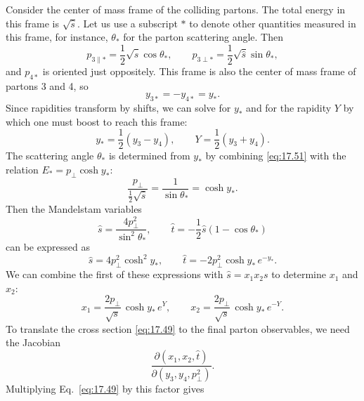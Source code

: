Consider the center of mass frame of the colliding partons.  The total energy
in this frame is $\sqrt{\hat{s}}$.  Let us use a subscript $*$ to denote
other quantities measured in this frame, for instance, $\theta_*$ for the
parton scattering angle.  Then
\begin{equation}
  p_{3\parallel*} = \frac{1}{2}\sqrt{\hat{s}}\cos\theta_*,\qquad
  p_{3\perp*} = \frac{1}{2}\sqrt{\hat{s}}\sin\theta_* ,
  \label{eq:17.51}
\end{equation}
and $p_{4*}$ is oriented just oppositely.  This frame is also the center of
mass frame of partons 3 and 4, so
\begin{equation}
  y_{3*} = -y_{4*} = y_* .
  \label{eq:17.52}
\end{equation}
Since rapidities transform by shifts, we can solve for $y_*$ and for the
rapidity $Y$ by which one must boost to reach this frame:
\begin{equation}
  y_* = \frac{1}{2}(y_3 - y_4),\qquad
  Y = \frac{1}{2}(y_3 + y_4) .
  \label{eq:17.53}
\end{equation}
The scattering angle $\theta_*$ is determined from $y_*$ by combining
\eqref{eq:17.51} with the relation $E_* = p_\perp\cosh y_*$:
\begin{equation}
  \frac{p_\perp}{\frac{1}{2}\sqrt{\hat{s}}} = \frac{1}{\sin\theta_*}
  = \cosh y_* .
  \label{eq:17.54}
\end{equation}
Then the Mandelstam variables
\begin{equation}
  \hat{s} = \frac{4p_\perp^2}{\sin^2\theta_*},\qquad
  \hat{t} = -\frac{1}{2}\hat{s}(1-\cos\theta_*)
  \label{eq:17.55}
\end{equation}
can be expressed as
\begin{equation}
  \hat{s} = 4p_\perp^2\cosh^2 y_*,\qquad
  \hat{t} = -2p_\perp^2\cosh y_*\,e^{-y_*} .
  \label{eq:17.56}
\end{equation}
We can combine the first of these expressions with $\hat{s} = x_1x_2s$ to
determine $x_1$ and $x_2$:
\begin{equation}
  x_1 = \frac{2p_\perp}{\sqrt{s}}\,\cosh y_*\,e^{Y},\qquad
  x_2 = \frac{2p_\perp}{\sqrt{s}}\,\cosh y_*\,e^{-Y} .
  \label{eq:17.57}
\end{equation}
To translate the cross section \eqref{eq:17.49} to the final parton
observables, we need the Jacobian
\begin{equation}
  \frac{\partial(x_1,x_2,\hat{t})}{\partial(y_3,y_4,p_\perp^2)} .
  \label{eq:17.58}
\end{equation}
Multiplying Eq.~\eqref{eq:17.49} by this factor gives

